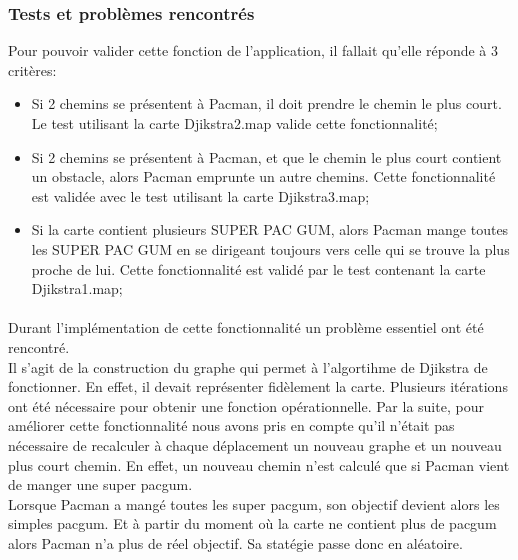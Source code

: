 \subsubsection{Tests et problèmes rencontrés}

Pour pouvoir valider cette fonction de l'application, il fallait qu'elle réponde à 3 critères:
\begin{itemize}
	\item Si 2 chemins se présentent à Pacman, il doit prendre le chemin le plus court. Le test utilisant la carte Djikstra2.map valide cette fonctionnalité;
	\item Si 2 chemins se présentent à Pacman, et que le chemin le plus court contient un obstacle, alors Pacman emprunte un autre chemins. Cette fonctionnalité est validée avec le test utilisant la carte Djikstra3.map;
	\item Si la carte contient plusieurs SUPER PAC GUM, alors Pacman mange toutes les SUPER PAC GUM en se dirigeant toujours vers celle qui se trouve la plus proche de lui. Cette fonctionnalité est validé par le test contenant la carte Djikstra1.map;
\end{itemize}

\paragraph{}
Durant l'implémentation de cette fonctionnalité un problème essentiel ont été rencontré.\\
Il s'agit de la construction du graphe qui permet à l'algortihme de Djikstra de fonctionner. En effet, il devait représenter fidèlement la carte. Plusieurs itérations ont été nécessaire pour obtenir une fonction opérationnelle. Par la suite, pour améliorer cette fonctionnalité nous avons pris en compte qu'il n'était pas nécessaire de recalculer à chaque déplacement un nouveau graphe et un nouveau plus court chemin. En effet, un nouveau chemin n'est calculé que si Pacman vient de manger une super pacgum.\\
Lorsque Pacman a mangé toutes les super pacgum, son objectif devient alors les simples pacgum. Et à partir du moment où la carte ne contient plus de pacgum alors Pacman n'a plus de réel objectif. Sa statégie passe donc en aléatoire.